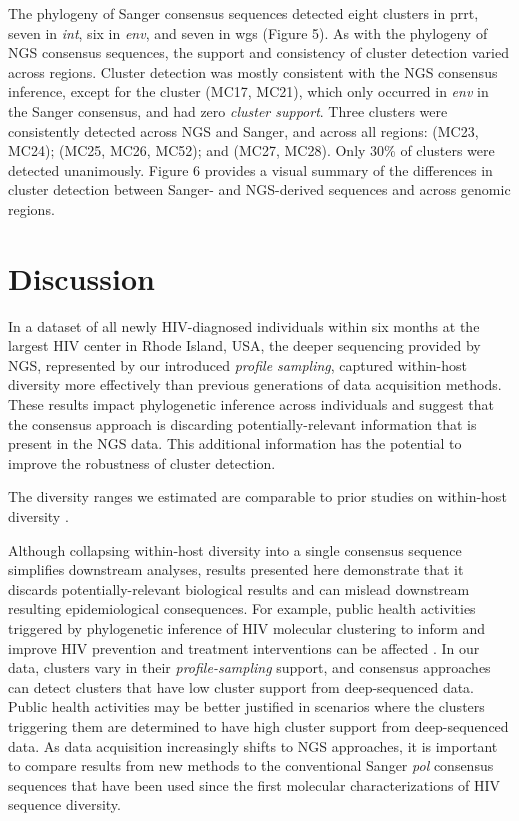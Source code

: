 \documentclass[letterpaper]{article}
\begin{document}
The phylogeny of Sanger consensus sequences detected eight clusters in prrt, seven in \emph{int}, six in \emph{env}, and seven in wgs (Figure 5). As with the phylogeny of NGS consensus sequences, the support and consistency of cluster detection varied across regions. Cluster detection was mostly consistent with the NGS consensus inference, except for the cluster (MC17, MC21), which only occurred in \emph{env} in the Sanger consensus, and had zero \emph{cluster support}. Three clusters were consistently detected across NGS and Sanger, and across all regions: (MC23, MC24); (MC25, MC26, MC52); and (MC27, MC28). Only 30\% of clusters were detected unanimously. Figure 6 provides a visual summary of the differences in cluster detection between Sanger- and NGS-derived sequences and across genomic regions.

\section*{Discussion}

In a dataset of all newly HIV-diagnosed individuals within six months at the largest HIV center in Rhode Island, USA, the deeper sequencing provided by NGS, represented by our introduced \emph{profile sampling}, captured within-host diversity more effectively than previous generations of data acquisition methods. These results impact phylogenetic inference across individuals and suggest that the consensus approach is discarding potentially-relevant information that is present in the NGS data. This additional information has the potential to improve the robustness of cluster detection.

The diversity ranges we estimated are comparable to prior studies on within-host diversity \parencite{li, zanini}.

Although collapsing within-host diversity into a single consensus sequence simplifies downstream analyses, results presented here demonstrate that it discards potentially-relevant biological results and can mislead downstream resulting epidemiological consequences. For example, public health activities triggered by phylogenetic inference of HIV molecular clustering to inform and improve HIV prevention and treatment interventions can be affected \parencite{peters}. In our data, clusters vary in their \emph{profile-sampling} support, and consensus approaches can detect clusters that have low cluster support from deep-sequenced data. Public health activities may be better justified in scenarios where the clusters triggering them are determined to have high cluster support from deep-sequenced data. As data acquisition increasingly shifts to NGS approaches, it is important to compare results from new methods to the conventional Sanger \emph{pol} consensus sequences that have been used since the first molecular characterizations of HIV sequence diversity.
\end{document}
